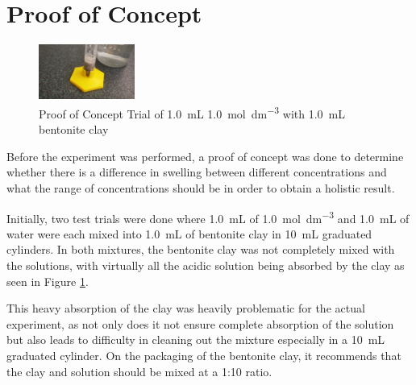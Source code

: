 \documentclass[11pt, letterpaper]{article}
\begin{document}
\section{Proof of Concept}

\begin{figure}
    \begin{center}
        \includegraphics[width=0.28\textwidth]{poc1MHCL.jpg}
    \end{center}
    \caption{Proof of Concept Trial of \SI{1.0}{mL} \SI{1.0}{mol.dm^{-3}}  with \SI{1.0}{mL} bentonite clay}
    \label{fig:poc1MHCL}
\end{figure}

Before the experiment was performed, a proof of concept
was done to determine whether there is a difference
in swelling between different concentrations and what the
range of concentrations should be in order to obtain
a holistic result.

Initially, two test trials were done where \SI{1.0}{mL} of
\SI{1.0}{mol.dm^{-3}}  and \SI{1.0}{mL} of water
were each mixed into \SI{1.0}{mL} of bentonite clay in
\SI{10}{mL} graduated cylinders. In both mixtures, the
bentonite clay was not completely mixed with the solutions,
with virtually all the acidic solution being absorbed by the
clay as seen in Figure \ref*{fig:poc1MHCL}.

This heavy absorption of the clay was heavily problematic
for the actual experiment, as not only does it not ensure
complete absorption of the solution but also leads to difficulty
in cleaning out the mixture especially in a \SI{10}{mL} graduated
cylinder. On the packaging of the bentonite clay, it recommends
that the clay and solution should be mixed at a 1:10 ratio.
\end{document}
